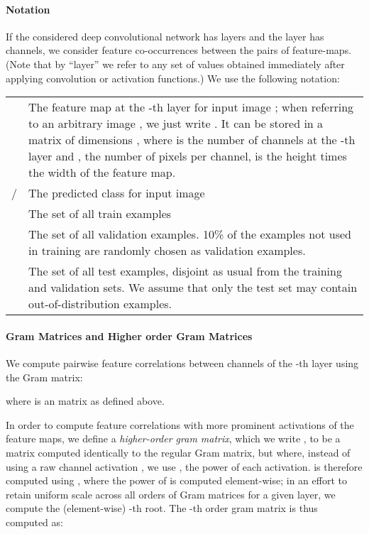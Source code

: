 \documentclass{article}
\begin{document}
\paragraph{Notation} If the considered deep convolutional network has  layers and the  layer has  channels, we consider feature co-occurrences between the  pairs of feature-maps. (Note that by ``layer'' we refer to any set of values obtained immediately after applying convolution or activation functions.)
We use the following notation:

\begin{tabular}{p{1.75cm}p{11cm}}
 & The feature map at the -th layer for input image ; when referring to an arbitrary image , we just write . It can be stored in a matrix of dimensions , where  is the number of channels at the -th layer and , the number of pixels per channel, is the height times the width of the feature map.\\
/ & The predicted class for input image \\
 & The set of all train examples\\
 & The set of all validation examples. 10\% of the examples not used in training are randomly chosen as validation examples.  \\
 & The set of all test examples, disjoint as usual from the training and validation sets. We assume that only the test set may contain out-of-distribution examples.\\
\end{tabular}

\paragraph{Gram Matrices and Higher order Gram Matrices} We compute pairwise feature correlations between channels of the -th layer using the Gram matrix:

where  is an  matrix as defined above.

In order to compute feature correlations with more prominent activations of the feature maps, we define a \textit{higher-order gram matrix}, which we write , to be a matrix computed identically to the regular Gram matrix, but where, instead of using a raw channel activation , we use , the  power of each activation.  is therefore computed using , where the power of  is computed element-wise; in an effort to retain uniform scale across all orders of Gram matrices for a given layer, we compute the (element-wise) -th root. The -th order gram matrix is thus computed as:
\end{document}
